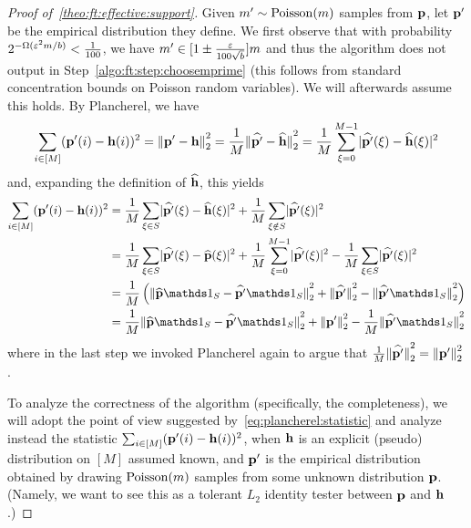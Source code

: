 \begin{proof}[Proof of~\cref{theo:ft:effective:support}]
Given $m'\sim\operatorname{Poisson}\!\left( m \right) $ samples from $\mathbf{p}$, let $\mathbf{p}'$ be the empirical distribution they define. 
We first observe that with probability $2^{-\Omega(\varepsilon^2m/b)}< \frac{1}{100}$, we have $m' \in [1\pm \frac{\varepsilon}{100\sqrt{b}}]m$ and thus the algorithm does not output \reject in Step~\ref{algo:ft:step:choosemprime} (this follows from standard concentration bounds on Poisson random variables). We will afterwards assume this holds. By Plancherel, we have
\[
  \sum_{i\in [M]} (\mathbf{p}'(i)-\mathbf{h}(i))^2 = {\lVert\mathbf{p}'-\mathbf{h}{\rVert}}_2^2 =  \frac{1}{M}{\lVert\widehat{\mathbf{p}'}-\widehat{\mathbf{h}}{\rVert}}_2^2 = \frac{1}{M}\sum_{\xi=0}^{M-1} \lvert \widehat{\mathbf{p}'}(\xi)-\widehat{\mathbf{h}}(\xi) \rvert^2
\]
and, expanding the definition of $\widehat{\mathbf{h}}$, this yields
\begin{align}
  \sum_{i\in [M]} (\q'(i)-\h(i))^2 &=  \frac{1}{M}\sum_{\xi\in S} \dabs{\fourier{\q'}(\xi)-\fourier{\h}(\xi)}^2 + \frac{1}{M}\sum_{\xi\notin S} \dabs{\fourier{\q'}(\xi)}^2 \notag\\
  &=  \frac{1}{M}\sum_{\xi\in S} \dabs{\fourier{\q'}(\xi)-\fourier{\q}(\xi)}^2 + \frac{1}{M}\sum_{\xi=0}^{M-1} \dabs{\fourier{\q'}(\xi)}^2 
  - \frac{1}{M}\sum_{\xi\in S} \dabs{\fourier{\q'}(\xi)}^2 \notag\\
  &=  \frac{1}{M}\left(\normtwo{\fourier{\q}\indicSet{S}-\fourier{\q'}\indicSet{S}}^2 + \normtwo{\fourier{\q'}}^2 - \normtwo{\fourier{\q'}\indicSet{S}}^2\right)  \notag\\
  &=  \frac{1}{M}\normtwo{\fourier{\q}\indicSet{S}-\fourier{\q'}\indicSet{S}}^2 + \normtwo{\q'}^2 - \frac{1}{M}\normtwo{\fourier{\q'}\indicSet{S}}^2  \label{eq:plancherel:statistic}
\end{align}
where in the last step we invoked  Plancherel again to argue that $\frac{1}{M}{\lVert\widehat{\mathbf{p}'}{\rVert}}_2^2={\lVert\mathbf{p}'{\rVert}}_2^2$.

To analyze the correctness of the algorithm (specifically, the completeness), we will adopt the point of view suggested by~\eqref{eq:plancherel:statistic} and analyze instead the statistic
$\sum_{i\in [M]} (\mathbf{p}'(i)-\mathbf{h}(i))^2$, when $\mathbf{h}$ is an explicit (pseudo) distribution on $[M]$ assumed known, and $\mathbf{p}'$ is the empirical distribution obtained by drawing $\operatorname{Poisson}\!\left( m \right) $ samples from some unknown distribution $\mathbf{p}$. (Namely, we want to see this as a tolerant $L_2$ identity tester between $\mathbf{p}$ and $\mathbf{h}$.)


\end{proof}
